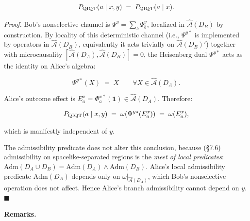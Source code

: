 \documentclass[11pt,a4paper]{article}
\begin{document}
\[
P_{\rm QIQT}(a \mid x, y) \;=\; P_{\rm QIQT}(a \mid x).
\]

\emph{Proof.} Bob's nonselective channel is $\Psi^y = \sum_b \Psi_b^y$, localized in $\hat{\mathcal{A}}(D_B)$ by construction. By locality of this deterministic channel (i.e., $\Psi^{y*}$ is implemented by operators in $\hat{\mathcal{A}}(D_B)$, equivalently it acts trivially on $\hat{\mathcal{A}}(D_B)'$) together with microcausality $[\hat{\mathcal{A}}(D_A), \hat{\mathcal{A}}(D_B)] = 0$, the Heisenberg dual $\Psi^{y*}$ acts as the identity on Alice's algebra:

\[
\Psi^{y*}(X) \;=\; X \qquad \forall X \in \hat{\mathcal{A}}(D_A).
\]

Alice's outcome effect is $E_a^x = \Phi_a^{x*}(\mathbf{1}) \in \hat{\mathcal{A}}(D_A)$. Therefore:

\[
P_{\rm QIQT}(a \mid x, y) \;=\; \omega\!\left(\Psi^{y*}(E_a^x)\right) \;=\; \omega(E_a^x),
\]

which is manifestly independent of $y$.

The admissibility predicate does not alter this conclusion, because (§7.6) admissibility on spacelike-separated regions is the \emph{meet of local predicates}: $\mathrm{Adm}(D_A \cup D_B) = \mathrm{Adm}(D_A) \wedge \mathrm{Adm}(D_B)$. Alice's local admissibility predicate $\mathrm{Adm}(D_A)$ depends only on $\omega|_{\hat{\mathcal{A}}(D_A)}$, which Bob's nonselective operation does not affect. Hence Alice's branch admissibility cannot depend on $y$. $\blacksquare$

\textbf{Remarks.}
\end{document}
